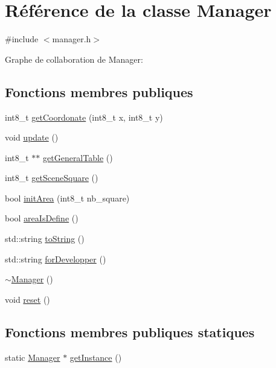 \hypertarget{class_manager}{\section{Référence de la classe Manager}
\label{class_manager}
}


{\ttfamily \#include $<$manager.\-h$>$}



Graphe de collaboration de Manager\-:
\subsection*{Fonctions membres publiques}
\begin{DoxyCompactItemize}
\item 
int8\-\_\-t \hyperlink{class_manager_ad8d432cd5aa2863d355d2e39d1936861}{get\-Coordonate} (int8\-\_\-t x, int8\-\_\-t y)
\item 
void \hyperlink{class_manager_af43da42550bd9746c5ea61a6aeee80de}{update} ()
\item 
int8\-\_\-t $\ast$$\ast$ \hyperlink{class_manager_a963d327a438d93b100ff68b475d2cf83}{get\-General\-Table} ()
\item 
int8\-\_\-t \hyperlink{class_manager_a60f89ec1bf61d37a74b4cd67a57d5702}{get\-Scene\-Square} ()
\item 
bool \hyperlink{class_manager_aaabcb64f4b95fcd10a778c3c033439fb}{init\-Area} (int8\-\_\-t nb\-\_\-square)
\item 
bool \hyperlink{class_manager_a5040d372e0142f22892fdce49ca96e03}{area\-Is\-Define} ()
\item 
std\-::string \hyperlink{class_manager_abfd21eccf46a73165312fb71293affc3}{to\-String} ()
\item 
std\-::string \hyperlink{class_manager_a21b3e54cbe4b045b9ac40ee53e403897}{for\-Developper} ()
\item 
\hyperlink{class_manager_a322cad25d7007438b3a043ad02253d29}{$\sim$\-Manager} ()
\item 
void \hyperlink{class_manager_a8cb433965677ad622ee43d59e24262e7}{reset} ()
\end{DoxyCompactItemize}
\subsection*{Fonctions membres publiques statiques}
\begin{DoxyCompactItemize}
\item 
static \hyperlink{class_manager}{Manager} $\ast$ \hyperlink{class_manager_a5d783bd86e9be93235898a46de80847f}{get\-Instance} ()
\end{DoxyCompactItemize}
